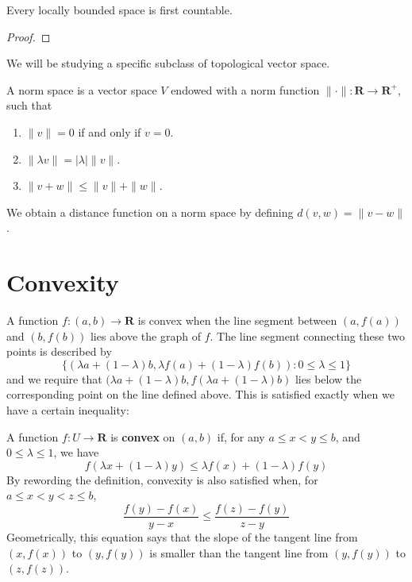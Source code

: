 \begin{theorem}
    Every locally bounded space is first countable.
\end{theorem}
\begin{proof}
    
\end{proof}

We will be studying a specific subclass of topological vector space.

\begin{definition}
    A norm space is a vector space $V$ endowed with a norm function $\| \cdotp \|: \mathbf{R} \to \mathbf{R}^+$, such that
    \begin{enumerate}
        \item $\| v \| = 0$ if and only if $v = 0$.
        \item $\| \lambda v \| = | \lambda | \| v \|$.
        \item $\| v + w \| \leq \| v \| + \| w \|$.
    \end{enumerate}
    We obtain a distance function on a norm space by defining $d(v,w) = \| v - w \|$.
\end{definition}

\section{Convexity}

A function $f:(a,b) \to \mathbf{R}$ is convex when the line segment between $(a,f(a))$ and $(b,f(b))$ lies above the graph of $f$. The line segment connecting these two points is described by
%
\[ \{ (\lambda a + (1 - \lambda) b, \lambda f(a) + (1 - \lambda) f(b)) : 0 \leq \lambda \leq 1 \} \]
%
and we require that $(\lambda a + (1 - \lambda)b, f(\lambda a + (1 - \lambda)b)$ lies below the corresponding point on the line defined above. This is satisfied exactly when we have a certain inequality:

\begin{definition}
    A function $f:U \to \mathbf{R}$ is {\bf convex} on $(a,b)$ if, for any $a \leq x < y \leq b$, and $0 \leq \lambda \leq 1$, we have
    \begin{equation} \label{convex1} f(\lambda x + (1 - \lambda) y) \leq \lambda f(x) + (1 - \lambda) f(y) \end{equation}
    By rewording the definition, convexity is also satisfied when, for $a \leq x < y < z \leq b$,
    \begin{equation} \label{convex2} \frac{f(y) - f(x)}{y - x} \leq \frac{f(z) - f(y)}{z - y} \end{equation}
    Geometrically, this equation says that the slope of the tangent line from $(x, f(x))$ to $(y, f(y))$ is smaller than the tangent line from $(y, f(y))$ to $(z, f(z))$.
\end{definition}

